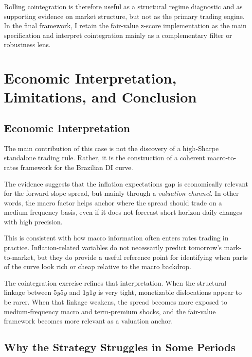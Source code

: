 \documentclass[11pt]{article}
\begin{document}
	Rolling cointegration is therefore useful as a structural regime diagnostic and as supporting evidence on market structure, but not as the primary trading engine. In the final framework, I retain the fair-value z-score implementation as the main specification and interpret cointegration mainly as a complementary filter or robustness lens.
	
	\section{Economic Interpretation, Limitations, and Conclusion}
	\label{sec:limitations_conclusion}
	
	\subsection{Economic Interpretation}
	\label{subsec:economic_interpretation}
	
	The main contribution of this case is not the discovery of a high-Sharpe standalone trading rule. Rather, it is the construction of a coherent macro-to-rates framework for the Brazilian DI curve.
	
	The evidence suggests that the inflation expectations gap is economically relevant for the forward slope spread, but mainly through a \emph{valuation channel}. In other words, the macro factor helps anchor where the spread should trade on a medium-frequency basis, even if it does not forecast short-horizon daily changes with high precision.
	
	This is consistent with how macro information often enters rates trading in practice. Inflation-related variables do not necessarily predict tomorrow's mark-to-market, but they do provide a useful reference point for identifying when parts of the curve look rich or cheap relative to the macro backdrop.
	
	The cointegration exercise refines that interpretation. When the structural linkage between \(5y5y\) and \(1y1y\) is very tight, monetizable dislocations appear to be rarer. When that linkage weakens, the spread becomes more exposed to medium-frequency macro and term-premium shocks, and the fair-value framework becomes more relevant as a valuation anchor.
	
	\subsection{Why the Strategy Struggles in Some Periods}
	\label{subsec:why_strategy_struggles}
	
\end{document}
